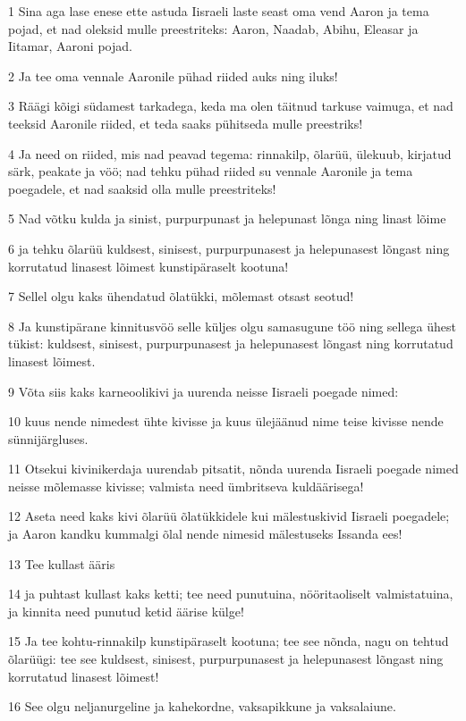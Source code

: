\par 1 Sina aga lase enese ette astuda Iisraeli laste seast oma vend Aaron ja tema pojad, et nad oleksid mulle preestriteks: Aaron, Naadab, Abihu, Eleasar ja Iitamar, Aaroni pojad.
\par 2 Ja tee oma vennale Aaronile pühad riided auks ning iluks!
\par 3 Räägi kõigi südamest tarkadega, keda ma olen täitnud tarkuse vaimuga, et nad teeksid Aaronile riided, et teda saaks pühitseda mulle preestriks!
\par 4 Ja need on riided, mis nad peavad tegema: rinnakilp, õlarüü, ülekuub, kirjatud särk, peakate ja vöö; nad tehku pühad riided su vennale Aaronile ja tema poegadele, et nad saaksid olla mulle preestriteks!
\par 5 Nad võtku kulda ja sinist, purpurpunast ja helepunast lõnga ning linast lõime
\par 6 ja tehku õlarüü kuldsest, sinisest, purpurpunasest ja helepunasest lõngast ning korrutatud linasest lõimest kunstipäraselt kootuna!
\par 7 Sellel olgu kaks ühendatud õlatükki, mõlemast otsast seotud!
\par 8 Ja kunstipärane kinnitusvöö selle küljes olgu samasugune töö ning sellega ühest tükist: kuldsest, sinisest, purpurpunasest ja helepunasest lõngast ning korrutatud linasest lõimest.
\par 9 Võta siis kaks karneoolikivi ja uurenda neisse Iisraeli poegade nimed:
\par 10 kuus nende nimedest ühte kivisse ja kuus ülejäänud nime teise kivisse nende sünnijärgluses.
\par 11 Otsekui kivinikerdaja uurendab pitsatit, nõnda uurenda Iisraeli poegade nimed neisse mõlemasse kivisse; valmista need ümbritseva kuldäärisega!
\par 12 Aseta need kaks kivi õlarüü õlatükkidele kui mälestuskivid Iisraeli poegadele; ja Aaron kandku kummalgi õlal nende nimesid mälestuseks Issanda ees!
\par 13 Tee kullast ääris
\par 14 ja puhtast kullast kaks ketti; tee need punutuina, nööritaoliselt valmistatuina, ja kinnita need punutud ketid äärise külge!
\par 15 Ja tee kohtu-rinnakilp kunstipäraselt kootuna; tee see nõnda, nagu on tehtud õlarüügi: tee see kuldsest, sinisest, purpurpunasest ja helepunasest lõngast ning korrutatud linasest lõimest!
\par 16 See olgu neljanurgeline ja kahekordne, vaksapikkune ja vaksalaiune.
